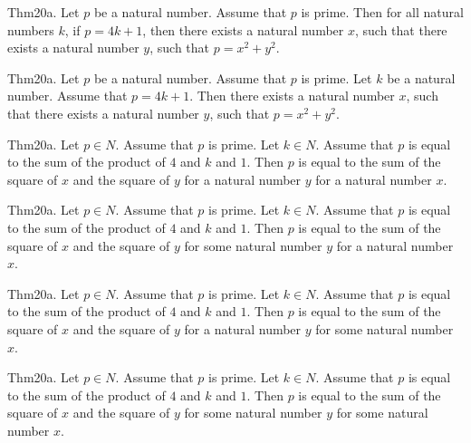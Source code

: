 \documentclass{article}
\begin{document}
Thm20a. Let $p$ be a natural number. Assume that $p$ is prime. Then for all natural numbers $k$, if $p = 4 k + 1$, then there exists a natural number $x$, such that there exists a natural number $y$, such that $p = x ^{ 2}+ y ^{ 2}$.

Thm20a. Let $p$ be a natural number. Assume that $p$ is prime. Let $k$ be a natural number. Assume that $p = 4 k + 1$. Then there exists a natural number $x$, such that there exists a natural number $y$, such that $p = x ^{ 2}+ y ^{ 2}$.

Thm20a. Let $p \in N$. Assume that $p$ is prime. Let $k \in N$. Assume that $p$ is equal to the sum of the product of $4$ and $k$ and $1$. Then $p$ is equal to the sum of the square of $x$ and the square of $y$ for a natural number $y$ for a natural number $x$.

Thm20a. Let $p \in N$. Assume that $p$ is prime. Let $k \in N$. Assume that $p$ is equal to the sum of the product of $4$ and $k$ and $1$. Then $p$ is equal to the sum of the square of $x$ and the square of $y$ for some natural number $y$ for a natural number $x$.

Thm20a. Let $p \in N$. Assume that $p$ is prime. Let $k \in N$. Assume that $p$ is equal to the sum of the product of $4$ and $k$ and $1$. Then $p$ is equal to the sum of the square of $x$ and the square of $y$ for a natural number $y$ for some natural number $x$.

Thm20a. Let $p \in N$. Assume that $p$ is prime. Let $k \in N$. Assume that $p$ is equal to the sum of the product of $4$ and $k$ and $1$. Then $p$ is equal to the sum of the square of $x$ and the square of $y$ for some natural number $y$ for some natural number $x$.
\end{document}
